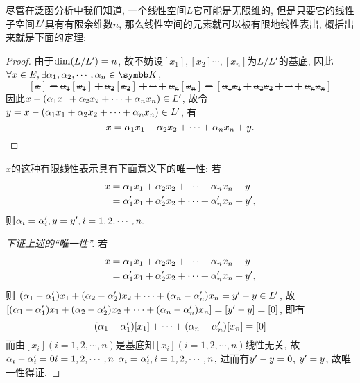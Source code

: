     尽管在泛函分析中我们知道, 一个线性空间$L$它可能是无限维的, 但是只要它的线性子空间$L^{\prime}$具有有限余维数$n$, 那么线性空间的元素就可以被有限地线性表出, 概括出来就是下面的定理: 
    \begin{proof}
        由于$\dim (L/L^{\prime})=n$, 故不妨设$[x_1],[x_2] \cdots, [x_n]$为$L/L^{\prime}$的基底, 因此$\forall x\in E, \exists \alpha_1, \alpha_2, \cdots, \alpha_n \in \K$, \st 
        \[
            [x]=\alpha_1[x_1]+\alpha_2[x_2]+\cdots+\alpha_n[x_n]=[\alpha_1 x_1 +\alpha_2 x_2 + \cdots + \alpha_n x_n]\]
        因此$x-(\alpha_1 x_1 +\alpha_2 x_2 + \cdots + \alpha_n x_n)\in L^{\prime}$, 故令$y=x-(\alpha_1 x_1 +\alpha_2 x_2 + \cdots + \alpha_n x_n)\in L^{\prime}$, 有\[x=\alpha_1 x_1 +\alpha_2 x_2 + \cdots + \alpha_n x_n+y.\qedhere\] 
    \end{proof}
    \begin{remark}
        $x$的这种有限线性表示具有下面意义下的唯一性: 若
        \begin{align*}
            x &= \alpha_1 x_1 +\alpha_2 x_2 + \cdots + \alpha_n x_n+y\\
            &=\alpha^{\prime}_1 x_1 +\alpha^{\prime}_2 x_2 + \cdots + \alpha^{\prime}_n x_n+ y^{\prime},
        \end{align*}
        则$\alpha_i=\alpha^{\prime}_i,y= y^{\prime},i=1,2,\cdots,n.$

        \begin{proof}[下证上述的“唯一性”]
            若
            \begin{align*}
                x &= \alpha_1 x_1 +\alpha_2 x_2 + \cdots + \alpha_n x_n+y\\
                &=\alpha^{\prime}_1 x_1 +\alpha^{\prime}_2 x_2 + \cdots + \alpha^{\prime}_n x_n+ y^{\prime},
            \end{align*}
            则 $(\alpha_1-\alpha^{\prime}_1)x_1+(\alpha_2-\alpha^{\prime}_2)x_2+\cdots+(\alpha_n-\alpha^{\prime}_n)x_n=y^{\prime} -y\in L^{\prime}$, 故$[(\alpha_1-\alpha^{\prime}_1)x_1+(\alpha_2-\alpha^{\prime}_2)x_2+\cdots+(\alpha_n-\alpha^{\prime}_n)x_n]=[y^{\prime} -y]=[0]$, 即有
            \[
                (\alpha_1-\alpha^{\prime}_1)[x_1]+\cdots+(\alpha_n-\alpha^{\prime}_n)[x_n]=[0]\]而由$[x_i](i=1,2,\cdots,n)$是基底知$[x_i](i=1,2,\cdots,n)$线性无关, 故$\alpha_i-\alpha^{\prime}_i=0i=1,2,\cdots,n$ \ie $\alpha_i=\alpha^{\prime}_i,i=1,2,\cdots,n$, 进而有$y^{\prime}-y=0$, \ie $y^{\prime}=y$, 故唯一性得证.
        \end{proof}
    \end{remark}

